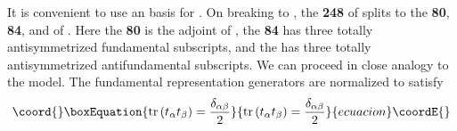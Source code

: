 \documentclass[a4paper,12pt,oneside]{article}
\begin{document}
It is convenient to use an \coordHE{} basis for \coordHE{}.
On breaking \coordHE{} to \coordHE{}, the \textbf{248} of
\coordHE{} splits to the \textbf{80}, \textbf{84}, and 
\coordHE{} of \coordHE{}.  Here the \textbf{80} is 
the adjoint of \coordHE{}, the \textbf{84} has three totally
antisymmetrized \coordHE{} fundamental subscripts, and the
\coordHE{} has three totally antisymmetrized 
\coordHE{} antifundamental subscripts.  We can proceed in 
close analogy to the \coordHE{} model.  The 
fundamental representation generators \coordHE{} 
are normalized to satisfy \cite{Rosner}
\begin{equation}\coord{}\boxEquation{\label{normalization}
\mathrm{tr}\left(t_\alpha t_\beta\right)=\frac{\delta_{\alpha\beta}}
{2}
}{\mathrm{tr}\left(t_\alpha t_\beta\right)=\frac{\delta_{\alpha\beta}}
{2}
}{ecuacion}\coordE{}\end{equation}
\end{document}
